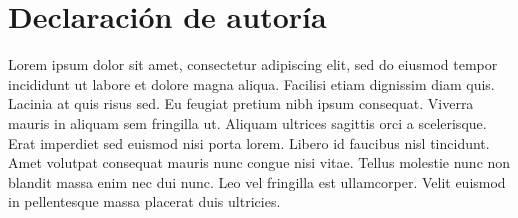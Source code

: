 \section*{Declaración de autoría}

Lorem ipsum dolor sit amet, consectetur adipiscing elit, sed do eiusmod tempor incididunt ut labore et dolore magna aliqua. Facilisi etiam dignissim diam quis. Lacinia at quis risus sed. Eu feugiat pretium nibh ipsum consequat. Viverra mauris in aliquam sem fringilla ut. Aliquam ultrices sagittis orci a scelerisque. Erat imperdiet sed euismod nisi porta lorem. Libero id faucibus nisl tincidunt. Amet volutpat consequat mauris nunc congue nisi vitae. Tellus molestie nunc non blandit massa enim nec dui nunc. Leo vel fringilla est ullamcorper. Velit euismod in pellentesque massa placerat duis ultricies.
